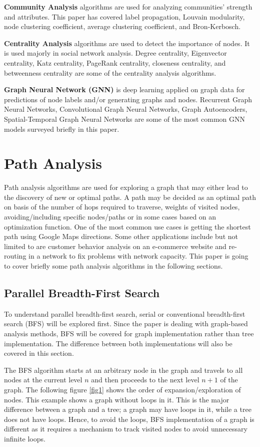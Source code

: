 \documentclass[journal,twoside,web]{ieeecolor}
\begin{document}
\textbf{Community Analysis} algorithms are used for analyzing communities' strength and attributes. This paper has covered label propagation, Louvain modularity, node clustering coefficient, average clustering coefficient, and Bron-Kerbosch.

\textbf{Centrality Analysis} algorithms are used to detect the importance of nodes. It is used majorly in social network analysis. Degree centrality, Eigenvector centrality, Katz centrality, PageRank centrality, closeness centrality, and betweenness centrality are some of the centrality analysis algorithms.

\textbf{Graph Neural Network (GNN)} is deep learning applied on graph data for predictions of node labels and/or generating graphs and nodes. Recurrent Graph Neural Networks, Convolutional Graph Neural Networks, Graph Autoencoders, Spatial-Temporal Graph Neural Networks are some of the most common GNN models surveyed briefly in this paper.  

\section{Path Analysis}
\label{sec:path}
Path analysis algorithms are used for exploring a graph that may either lead to the discovery of new or optimal paths. A path may be decided as an optimal path on basis of the number of hops required to traverse, weights of visited nodes, avoiding/including specific nodes/paths or in some cases based on an optimization function. One of the most common use cases is getting the shortest path using Google Maps directions. Some other applications include but not limited to are customer behavior analysis on an e-commerce website and re-routing in a network to fix problems with network capacity. This paper is going to cover briefly some path analysis algorithms in the following sections.

\subsection{Parallel Breadth-First Search}
To understand parallel breadth-first search, serial or conventional breadth-first search (BFS) will be explored first. Since the paper is dealing with graph-based analysis methods, BFS will be covered for graph implementation rather than tree implementation. The difference between both implementations will also be covered in this section.

The BFS algorithm starts at an arbitrary node in the graph and travels to all nodes at the current level $n$ and then proceeds to the next level $n + 1$ of the graph. The following figure \ref{fig1} shows the order of expansion/exploration of nodes. This example shows a graph without loops in it. This is the major difference between a graph and a tree; a graph may have loops in it, while a tree does not have loops. Hence, to avoid the loops, BFS implementation of a graph is different as it requires a mechanism to track visited nodes to avoid unnecessary infinite loops.
\end{document}
